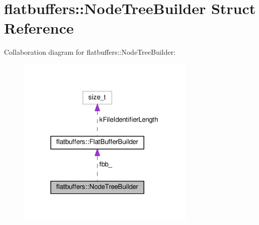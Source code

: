 \hypertarget{structflatbuffers_1_1NodeTreeBuilder}{}\section{flatbuffers\+:\+:Node\+Tree\+Builder Struct Reference}
\label{structflatbuffers_1_1NodeTreeBuilder}


Collaboration diagram for flatbuffers\+:\+:Node\+Tree\+Builder\+:
\nopagebreak
\begin{figure}[H]
\begin{center}
\leavevmode
\includegraphics[width=241pt]{structflatbuffers_1_1NodeTreeBuilder__coll__graph}
\end{center}
\end{figure}
